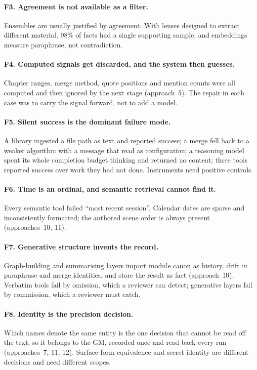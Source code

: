 \documentclass[11pt]{article}
\begin{document}
\paragraph{F3. Agreement is not available as a filter.}
Ensembles are usually justified by agreement. With lenses designed to extract different material, 98\%
of facts had a single supporting sample, and embeddings measure paraphrase, not contradiction.

\paragraph{F4. Computed signals get discarded, and the system then guesses.}
Chapter ranges, merge method, quote positions and mention counts were all computed and then ignored by
the next stage (approach~5). The repair in each case was to carry the signal forward, not to add a model.

\paragraph{F5. Silent success is the dominant failure mode.}
A library ingested a file path as text and reported success; a merge fell back to a weaker algorithm with
a message that read as configuration; a reasoning model spent its whole completion budget thinking and
returned no content; three tools reported success over work they had not done. Instruments need positive
controls.

\paragraph{F6. Time is an ordinal, and semantic retrieval cannot find it.}
Every semantic tool failed ``most recent session''. Calendar dates are sparse and inconsistently
formatted; the authored scene order is always present (approaches~10, 11).

\paragraph{F7. Generative structure invents the record.}
Graph-building and summarising layers import module canon as history, drift in paraphrase and merge
identities, and store the result as fact (approach~10). Verbatim tools fail by omission, which a
reviewer can detect; generative layers fail by commission, which a reviewer must catch.

\paragraph{F8. Identity is the precision decision.}
Which names denote the same entity is the one decision that cannot be read off the text, so it belongs
to the GM, recorded once and read back every run (approaches~7, 11, 12). Surface-form equivalence and
secret identity are different decisions and need different scopes.
\end{document}
